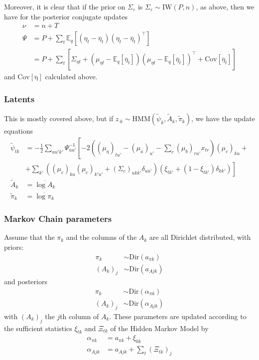 \documentclass[11pt]{article}
\begin{document}
Moreover, it is clear that if the prior on $\Sigma_\varepsilon$ is $\Sigma_\varepsilon \sim \mathrm{IW}(P, n)$, as above, then we have for the posterior conjugate updates
\begin{align}
    \nu &= n + T \\
    \Psi &= P + \sum_t \mathbb{E}_q[(\eta_t - \overline{\eta}_t) (\eta_t - \overline{\eta}_t)^\top] \\
    &= P + \sum_t \left[\Sigma_{\eta t} + (\mu_{\eta t} - \mathbb{E}_q[\overline{\eta}_{t}])
    (\mu_{\eta t} - \mathbb{E}_q[\overline{\eta}_{t}])^\top
    + \mathrm{Cov}[\overline{\eta}_{t}]\right]
\end{align}
and $\mathrm{Cov[\overline{\eta}]}$ calculated above.

\subsubsection{Latents}
This is mostly covered above, but if $z_{\cdot k} \sim \mathrm{HMM}(\tilde{\psi}_k, \tilde{A}_k, \tilde{\pi}_k)$, we have the update equations
\begin{align}
    \tilde{\psi}_{tk} &= -\frac{1}{2}\sum_{uu'k'} \Psi^{-1}_{uu'}
    \left[-2\left((\mu_\eta)_{tu'} - (\mu_a)_{u'} - \sum_r (\mu_b)_{ru'} x_{tr}\right)
    (\mu_c)_{ku} + \right. \\
    &+
    \left.
    \sum_{k'}((\mu_c)_{ku}(\mu_c)_{k'u'} + (\Sigma_c)_{ukk'}\delta_{uu'})(\xi_{tk'} + (1 - \xi_{tk'})\delta_{kk'})\right]\\
    \tilde{A}_k &= \overline{\log A_k} \\
    \tilde{\pi}_k &= \overline{\log \pi_k}
\end{align}

\subsubsection{Markov Chain parameters}
Assume that the $\pi_k$ and the columns of the $A_k$ are all Dirichlet distributed, with priors:
\begin{align}
    \pi_k &\sim \mathrm{Dir}(a_{\pi k}) \\
    (A_k)_j &\sim \mathrm{Dir}(a_{A jk})
\end{align}
and posteriors
\begin{align}
    \pi_k &\sim \mathrm{Dir}(\alpha_{\pi k}) \\
    (A_k)_j &\sim \mathrm{Dir}(\alpha_{A jk})
\end{align}
with $(A_k)_j$ the $j$th column of $A_k$.
These parameters are updated according to the sufficient statistics $\xi_{tk}$ and $\Xi_{tk}$ of the Hidden Markov Model by
\begin{align}
    \alpha_{\pi k} &= a_{\pi k} + \xi_{0k} \\
    \alpha_{A j k} &= a_{A j k} + \sum_t (\Xi_{tk})_j
\end{align}
\end{document}
